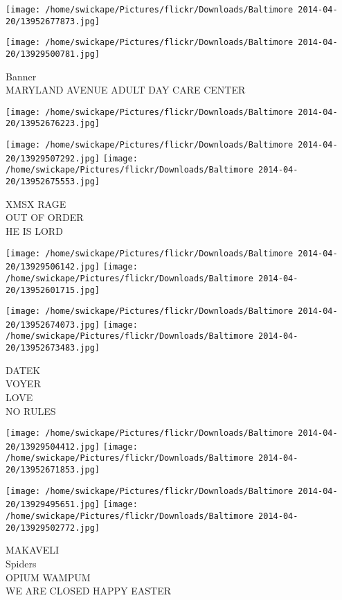 \documentclass[10pt,letterpaper]{article}
\begin{document}
\texttt{[image: /home/swickape/Pictures/flickr/Downloads/Baltimore 2014-04-20/13952677873.jpg]}

\vspace{0.25in}
\texttt{[image: /home/swickape/Pictures/flickr/Downloads/Baltimore 2014-04-20/13929500781.jpg]}

Banner\\
MARYLAND AVENUE ADULT DAY CARE CENTER
\pagebreak

\texttt{[image: /home/swickape/Pictures/flickr/Downloads/Baltimore 2014-04-20/13952676223.jpg]}

\vspace{0.25in}
\texttt{[image: /home/swickape/Pictures/flickr/Downloads/Baltimore 2014-04-20/13929507292.jpg]}
\texttt{[image: /home/swickape/Pictures/flickr/Downloads/Baltimore 2014-04-20/13952675553.jpg]}

XMSX RAGE\\
OUT OF ORDER\\
HE IS LORD
\pagebreak

\texttt{[image: /home/swickape/Pictures/flickr/Downloads/Baltimore 2014-04-20/13929506142.jpg]}
\texttt{[image: /home/swickape/Pictures/flickr/Downloads/Baltimore 2014-04-20/13952601715.jpg]}

\texttt{[image: /home/swickape/Pictures/flickr/Downloads/Baltimore 2014-04-20/13952674073.jpg]}
\texttt{[image: /home/swickape/Pictures/flickr/Downloads/Baltimore 2014-04-20/13952673483.jpg]}

DATEK\\
VOYER\\
LOVE\\
NO RULES
\pagebreak

\texttt{[image: /home/swickape/Pictures/flickr/Downloads/Baltimore 2014-04-20/13929504412.jpg]}
\texttt{[image: /home/swickape/Pictures/flickr/Downloads/Baltimore 2014-04-20/13952671853.jpg]}

\texttt{[image: /home/swickape/Pictures/flickr/Downloads/Baltimore 2014-04-20/13929495651.jpg]}
\texttt{[image: /home/swickape/Pictures/flickr/Downloads/Baltimore 2014-04-20/13929502772.jpg]}

MAKAVELI\\
Spiders\\
OPIUM WAMPUM\\
WE ARE CLOSED HAPPY EASTER
\pagebreak
\end{document}
